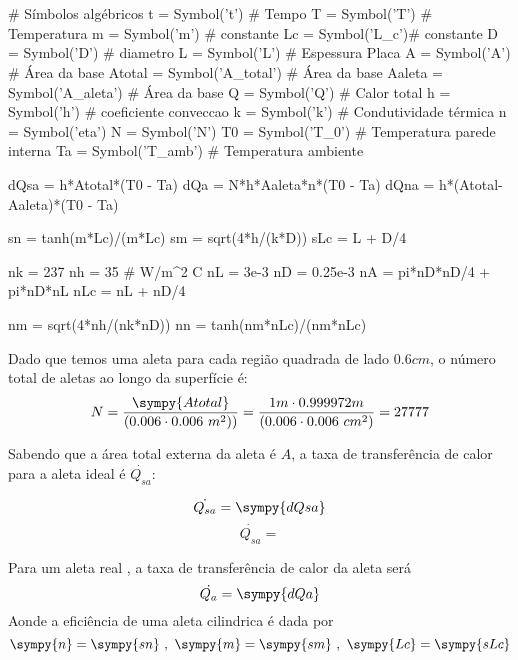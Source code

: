 \documentclass[a4paper,11pt]{article}
\title{\tituloRelatorio}
\begin{document}
\maketitle
\section{} %
\section{} %
\begin{sympycode}
# Símbolos algébricos
t = Symbol('t') # Tempo
T = Symbol('T') # Temperatura
m = Symbol('m') # constante
Lc = Symbol('L_c')# constante
D = Symbol('D') # diametro
L = Symbol('L') # Espessura Placa
A = Symbol('A') # Área da base
Atotal = Symbol('A_total') # Área da base
Aaleta = Symbol('A_aleta') # Área da base
Q = Symbol('Q') # Calor total
h = Symbol('h') # coeficiente conveccao
k = Symbol('k') # Condutividade térmica
n = Symbol('eta')
N = Symbol('N')
T0 = Symbol('T_0') # Temperatura parede interna
Ta = Symbol('T_amb') # Temperatura ambiente


dQsa = h*Atotal*(T0 - Ta)
dQa = N*h*Aaleta*n*(T0 - Ta)
dQna = h*(Atotal-Aaleta)*(T0 - Ta)

sn = tanh(m*Lc)/(m*Lc)
sm = sqrt(4*h/(k*D))
sLc = L + D/4

nk = 237
nh = 35 # W/m^2 C
nL = 3e-3
nD = 0.25e-3
nA = pi*nD*nD/4 + pi*nD*nL
nLc = nL + nD/4

nm = sqrt(4*nh/(nk*nD))
nn = tanh(nm*nLc)/(nm*nLc)
\end{sympycode}

Dado que temos uma aleta para cada região quadrada de lado $0.6cm$, o número total de aletas ao longo da superfície é:
$$
N = \frac{\sympy{Atotal}}{(0.006\cdot 0.006\ m^2))} = \frac{1m\cdot 0.999972m}{(0.006\cdot 0.006\ cm^2)} = 27777
$$

Sabendo que a área total externa da aleta é $A$, a taxa de transferência de calor para a aleta ideal é $\dot{Q_{sa}}$:

\begin{equation}
\dot{Q_{sa}} = \sympy{dQsa}
\end{equation}
$$
\dot{Q_{sa}} =
$$

Para um aleta real , a taxa de transferência de calor da aleta será
\begin{equation}
\dot{Q_{a}} = \sympy{dQa}
\end{equation}
Aonde a eficiência de uma aleta cilindrica é dada por
\begin{equation}
\sympy{n} = \sympy{sn} \ ,\ \sympy{m} = \sympy{sm} \ ,\ \sympy{Lc} = \sympy{sLc}
\end{equation}
\end{document}

